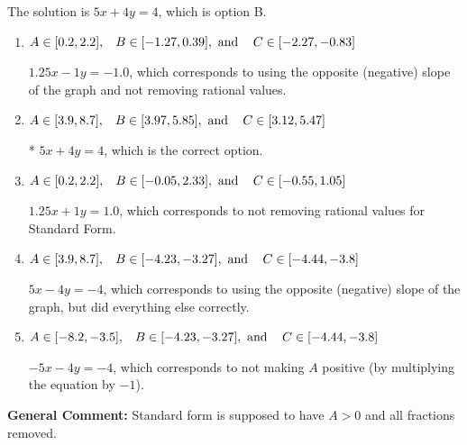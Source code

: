 \documentclass{extbook}[14pt]
\begin{document}
\begin{enumerate}
{The solution is \( 5x + 4y = 4 \), which is option B.\begin{enumerate}[label=\Alph*.]
\item \( A \in [0.2, 2.2], \hspace{3mm} B \in [-1.27, 0.39], \text{ and } \hspace{3mm} C \in [-2.27, -0.83] \)

 $1.25x - 1y = -1.0$, which corresponds to using the opposite (negative) slope of the graph and not removing rational values.
\item \( A \in [3.9, 8.7], \hspace{3mm} B \in [3.97, 5.85], \text{ and } \hspace{3mm} C \in [3.12, 5.47] \)

* $5x + 4y = 4$, which is the correct option.
\item \( A \in [0.2, 2.2], \hspace{3mm} B \in [-0.05, 2.33], \text{ and } \hspace{3mm} C \in [-0.55, 1.05] \)

 $1.25x + 1y = 1.0$, which corresponds to not removing rational values for Standard Form.
\item \( A \in [3.9, 8.7], \hspace{3mm} B \in [-4.23, -3.27], \text{ and } \hspace{3mm} C \in [-4.44, -3.8] \)

 $5x - 4y = -4$, which corresponds to using the opposite (negative) slope of the graph, but did everything else correctly.
\item \( A \in [-8.2, -3.5], \hspace{3mm} B \in [-4.23, -3.27], \text{ and } \hspace{3mm} C \in [-4.44, -3.8] \)

 $-5x - 4y = -4$, which corresponds to not making $A$ positive (by multiplying the equation by $-1$).
\end{enumerate}

\textbf{General Comment:} Standard form is supposed to have $A > 0$ and all fractions removed.
}
\end{enumerate}
\end{document}
